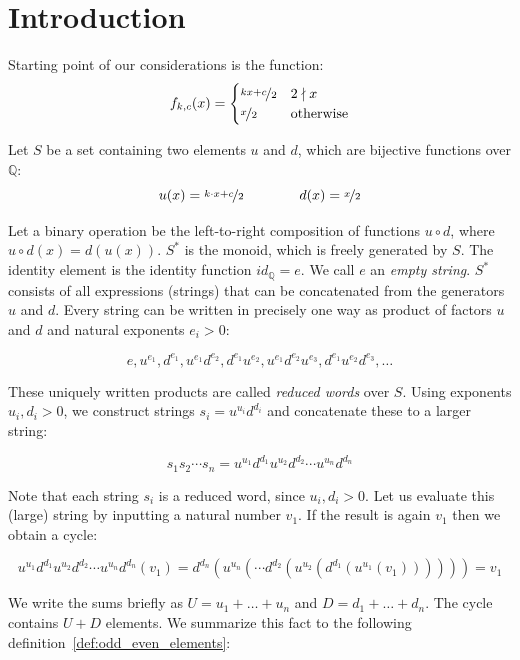 \documentclass[12pt]{amsart}
\theoremstyle{definition}
\begin{document}
\section{Introduction}
\label{sec:introduction}

Starting point of our considerations is the function:
\begin{equation}
\label{eq:collatz_function}
f_{k,c}(x)=
\begin{cases}
\nicefrac{kx+c}{2}	&	2\nmid x\\
\nicefrac{x}{2}		&	\text{otherwise}
\end{cases}
\end{equation}

Let $S$ be a set containing two elements $u$ and $d$, which are bijective functions over $\mathbb{Q}$:
\begin{equation}
u(x)=\nicefrac{k\cdot x+c}{2}\hspace{4em} d(x)=\nicefrac{x}{2}
\end{equation}

Let a binary operation be the left-to-right composition of functions $u\circ d$, where $u\circ d(x)=d(u(x))$. $S^\ast$ is the monoid, which is freely generated by $S$. The identity element is the identity function $id_{\mathbb{Q}}=e$. We call $e$ an \textit{empty string}. $S^\ast$ consists of all expressions (strings) that can be concatenated from the generators $u$ and $d$. Every string can be written in precisely one way as product of factors $u$ and $d$ and natural exponents $e_i>0$:

\[
e,u^{e_1},d^{e_1},u^{e_1}d^{e_2},d^{e_1}u^{e_2},u^{e_1}d^{e_2}u^{e_3},d^{e_1}u^{e_2}d^{e_3},\ldots
\]

These uniquely written products are called \textit{reduced words} over $S$. Using exponents $u_i,d_i>0$, we construct strings $s_i=u^{u_i}d^{d_i}$ and concatenate these to a larger string:

\[
s_1s_2\cdots s_n=u^{u_1}d^{d_1}u^{u_2}d^{d_2}\cdots u^{u_n}d^{d_n}
\]

Note that each string $s_i$ is a reduced word, since $u_i,d_i>0$. Let us evaluate this (large) string by inputting a natural number $v_1$. If the result is again $v_1$ then we obtain a cycle:

\[
u^{u_1}d^{d_1}u^{u_2}d^{d_2}\cdots u^{u_n}d^{d_n}(v_1)=d^{d_n}(u^{u_n}(\cdots d^{d_2}(u^{u_2}(d^{d_1}(u^{u_1}(v_1))))))=v_1
\]

We write the sums briefly as $U=u_1+\ldots+u_n$ and $D=d_1+\ldots+d_n$. The cycle contains $U+D$ elements. We summarize this fact to the following definition~\ref{def:odd_even_elements}:
\end{document}
